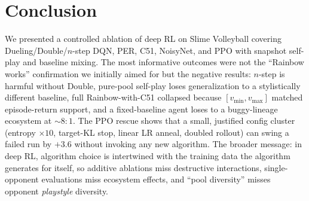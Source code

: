 \section{Conclusion}
\label{sec:conclusion}

We presented a controlled ablation of deep RL on Slime Volleyball
covering Dueling/Double/$n$-step DQN, PER, C51, NoisyNet, and PPO with
snapshot self-play and baseline mixing. The most informative outcomes
were not the ``Rainbow works'' confirmation we initially aimed for but
the negative results: $n$-step is harmful without Double, pure-pool
self-play loses generalization to a stylistically different baseline,
full Rainbow-with-C51 collapsed because $[v_{\min},v_{\max}]$ matched
episode-return support, and a fixed-baseline agent loses to a
buggy-lineage ecosystem at $\sim 8{:}1$. The PPO rescue shows that a
small, justified config cluster (entropy $\times 10$, target-KL stop,
linear LR anneal, doubled rollout) can swing a failed run by $+3.6$
without invoking any new algorithm. The broader message: in deep RL,
algorithm choice is intertwined with the training data the algorithm
generates for itself, so additive ablations miss destructive
interactions, single-opponent evaluations miss ecosystem effects, and
``pool diversity'' misses opponent \emph{playstyle} diversity.
